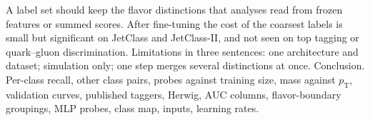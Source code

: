{
 A label set should keep the flavor distinctions that analyses read from frozen features or summed scores.
 After fine-tuning the cost of the coarsest labels is small but significant on JetClass and JetClass-II, and not seen on top tagging or quark--gluon discrimination.
 Limitations in three sentences: one architecture and dataset; simulation only; one step merges several distinctions at once.
 Conclusion.
 Per-class recall, other class pairs, probes against training size, mass against $p_{\mathrm T}$, validation curves, published taggers, Herwig, AUC columns, flavor-boundary groupings, MLP probes, class map, inputs, learning rates.
\par}
